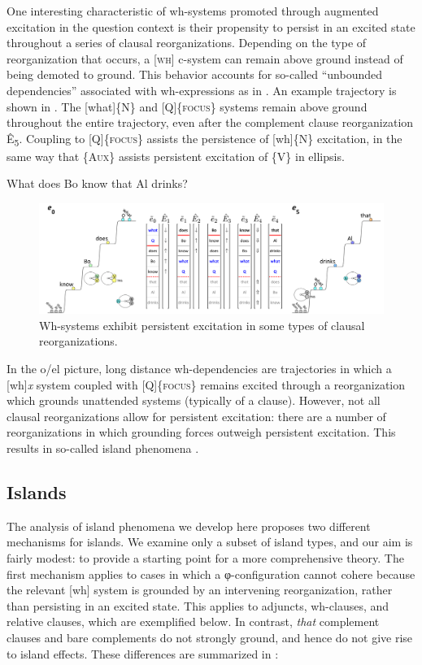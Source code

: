   One interesting characteristic of wh-systems promoted through augmented excitation in the question context is their propensity to persist in an excited state throughout a series of clausal reorganizations. Depending on the type of reorganization that occurs, a [\textsc{wh}] c-system can remain above ground instead of being demoted to ground. This behavior accounts for so-called “unbounded dependencies” associated with wh-expressions as in . An example trajectory is shown in {}. The [what]\{N\} and [Q]\{\textsc{focus}\} systems remain above ground throughout the entire trajectory, even after the complement clause reorganization Ê\textsubscript{5}. Coupling to [Q]\{\textsc{focus}\} assists the persistence of [wh]\{N\} excitation, in the same way that \{A\textsc{ux}\} assists persistent excitation of \{V\} in ellipsis. 

  \ea\label{ex:7:20}
    {What does Bo know that Al drinks?}
\z
  
\begin{figure}
\includegraphics[width=\textwidth]{figures/Tilsen-img162.png}
\caption{Wh-systems exhibit persistent excitation in some types of clausal reorganizations.}
\label{fig:7:18}
\end{figure}
 

  In the o/el picture, long distance wh-dependencies are trajectories in which a [wh]{\textit{x}} system coupled with [Q]\{\textsc{focus}\} remains excited through a reorganization which grounds unattended systems (typically of a clause). However, not all clausal reorganizations allow for persistent excitation: there are a number of reorganizations in which grounding forces outweigh persistent excitation. This results in so-called island phenomena \citep{Ross1967}.

\subsection{Islands}

The analysis of island phenomena we develop here proposes two different mechanisms for islands. We examine only a subset of island types, and our aim is fairly modest: to provide a starting point for a more comprehensive theory. The first mechanism applies to cases in which a φ-configuration cannot cohere because the relevant [wh] system is grounded by an intervening reorganization, rather than persisting in an excited state. This applies to adjuncts, wh-clauses, and relative clauses, which are exemplified below. In contrast, \textit{that} complement clauses and bare complements do not strongly ground, and hence do not give rise to island effects. These differences are summarized in {}:

